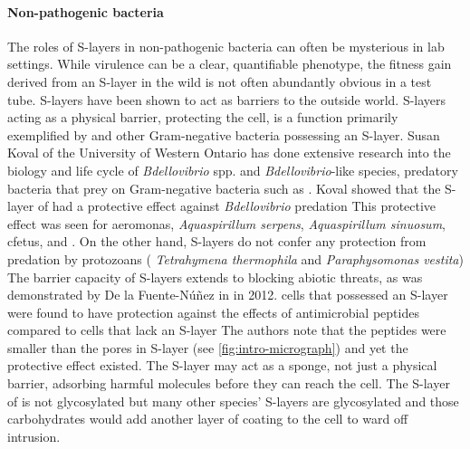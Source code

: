 \paragraph{Non-pathogenic bacteria} \label{sec:non-path-bact} %
The roles of \acp{S-layer} in non-pathogenic bacteria can often be mysterious in lab settings.
While virulence can be a clear, quantifiable phenotype, the fitness gain derived from an \ac{S-layer} in the wild is not often abundantly obvious in a test tube. \acp{S-layer} have
been shown to act as barriers to the outside world. \acp{S-layer} acting as a physical barrier, protecting the cell, is a function primarily exemplified by \caulobacter and other
Gram-negative bacteria possessing an \ac{S-layer}. Susan Koval of the University of Western Ontario has done extensive research into the biology and life cycle of
\textit{Bdellovibrio} spp. and \textit{Bdellovibrio}-like species, predatory bacteria that prey on Gram-negative bacteria such as \caulobacter. Koval showed that the \ac{S-layer}
of \caulobacter had a protective effect against \textit{Bdellovibrio} predation This protective effect was seen for \ac{aeromonas}, \textit{Aquaspirillum
serpens}, \textit{Aquaspirillum sinuosum}, \ac{cfetus}, and \caulobacter. On the other hand, \acp{S-layer} do not confer any protection from predation by protozoans (\eg{}
\textit{Tetrahymena thermophila} and \textit{Paraphysomonas vestita}) The barrier capacity of \acp{S-layer} extends to blocking abiotic threats, as
was demonstrated by De la Fuente-N{\'u}{\~n}ez \etal in \caulobacter in 2012. \caulobacter cells that possessed an \ac{S-layer} were found to have protection against the effects of
antimicrobial peptides compared to cells that lack an \ac{S-layer} The authors note that the peptides were smaller than the pores in \caulobacter
\ac{S-layer} (see \cref{fig:intro-micrograph}) and yet the protective effect existed. The \ac{S-layer} may act as a sponge, not just a physical barrier, adsorbing harmful molecules
before they can reach the cell. The \ac{S-layer} of \caulobacter{} is not glycosylated but many other species' \acp{S-layer} are glycosylated and those carbohydrates would add
another layer of coating to the cell to ward off intrusion.


